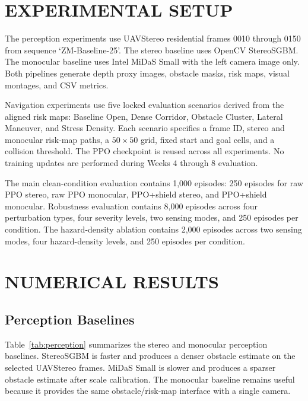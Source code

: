 \documentclass[12pt]{article}
\begin{document}
\section{\MakeUppercase{Experimental Setup}}

\noindent
The perception experiments use UAVStereo residential frames 0010 through 0150 from sequence `ZM-Baseline-25'. The stereo baseline uses OpenCV StereoSGBM. The monocular baseline uses Intel MiDaS Small with the left camera image only. Both pipelines generate depth proxy images, obstacle masks, risk maps, visual montages, and CSV metrics.

Navigation experiments use five locked evaluation scenarios derived from the aligned risk maps: Baseline Open, Dense Corridor, Obstacle Cluster, Lateral Maneuver, and Stress Density. Each scenario specifies a frame ID, stereo and monocular risk-map paths, a $50 \times 50$ grid, fixed start and goal cells, and a collision threshold. The PPO checkpoint is reused across all experiments. No training updates are performed during Weeks 4 through 8 evaluation.

The main clean-condition evaluation contains 1,000 episodes: 250 episodes for raw PPO stereo, raw PPO monocular, PPO+shield stereo, and PPO+shield monocular. Robustness evaluation contains 8,000 episodes across four perturbation types, four severity levels, two sensing modes, and 250 episodes per condition. The hazard-density ablation contains 2,000 episodes across two sensing modes, four hazard-density levels, and 250 episodes per condition.

\section{\MakeUppercase{Numerical Results}}

\subsection{Perception Baselines}

\noindent
Table~\ref{tab:perception} summarizes the stereo and monocular perception baselines. StereoSGBM is faster and produces a denser obstacle estimate on the selected UAVStereo frames. MiDaS Small is slower and produces a sparser obstacle estimate after scale calibration. The monocular baseline remains useful because it provides the same obstacle/risk-map interface with a single camera.
\end{document}
